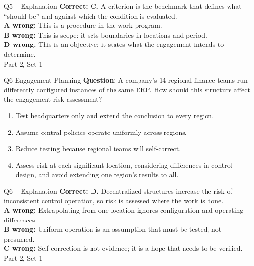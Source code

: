 \documentclass[aspectratio=169,10pt]{beamer}
\begin{document}
\begin{frame}[t]{Q5 -- Explanation}
	\footnotesize
	\textbf{Correct: C.} A criterion is the benchmark that defines what ``should be'' and against which the condition is evaluated. \\[5pt]
\textbf{A wrong:} This is a procedure in the work program. \\[3pt]
\textbf{B wrong:} This is scope: it sets boundaries in locations and period. \\[3pt]
\textbf{D wrong:} This is an objective: it states what the engagement intends to determine. \\[3pt]
	\vfill {\tiny Part 2, Set 1}
\end{frame}
\begin{frame}[t]{Q6 \hfill {\scriptsize Engagement Planning}}
	\small
	\textbf{Question:} A company's 14 regional finance teams run differently configured instances of the same ERP. How should this structure affect the engagement risk assessment?
	\begin{enumerate}[label=\Alph*.,itemsep=1pt,topsep=3pt]
			\item Test headquarters only and extend the conclusion to every region.
			\item Assume central policies operate uniformly across regions.
			\item Reduce testing because regional teams will self-correct.
			\item Assess risk at each significant location, considering differences in control design, and avoid extending one region's results to all.
	\end{enumerate}
\end{frame}
\begin{frame}[t]{Q6 -- Explanation}
	\footnotesize
	\textbf{Correct: D.} Decentralized structures increase the risk of inconsistent control operation, so risk is assessed where the work is done. \\[5pt]
\textbf{A wrong:} Extrapolating from one location ignores configuration and operating differences. \\[3pt]
\textbf{B wrong:} Uniform operation is an assumption that must be tested, not presumed. \\[3pt]
\textbf{C wrong:} Self-correction is not evidence; it is a hope that needs to be verified. \\[3pt]
	\vfill {\tiny Part 2, Set 1}
\end{frame}
\end{document}
